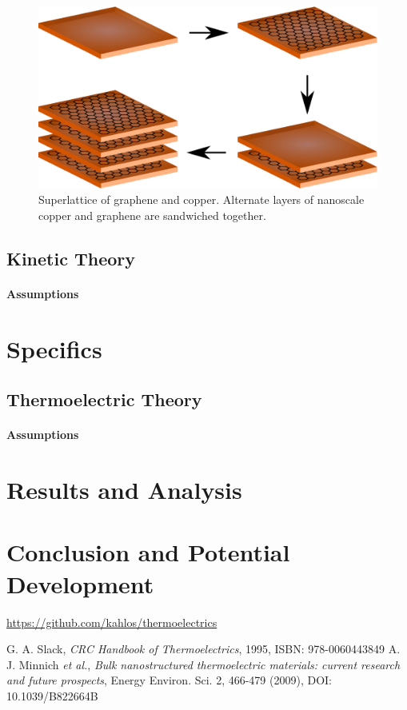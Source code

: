 \documentclass[12pt,titlepage,draft]{article}
\begin{document}
\begin{figure}
	\centering
	\includegraphics{graphene-superlattice.eps}
	\caption{Superlattice of graphene and copper. Alternate layers of
	nanoscale copper and graphene are sandwiched together.}
\end{figure}

\subsection{Kinetic Theory}
\paragraph{Assumptions}

\section{Specifics}
\subsection{Thermoelectric Theory}
\paragraph{Assumptions}

\section{Results and Analysis}

\section{Conclusion and Potential Development}

\url{https://github.com/kahlos/thermoelectrics}


\begin{thebibliography}{2}
G. A. Slack, \emph{CRC Handbook of Thermoelectrics}, 1995, ISBN: 978-0060443849
A. J. Minnich \emph{et al.}, \emph{Bulk nanostructured thermoelectric materials: current research and future prospects}, Energy Environ. Sci. 2, 466-479 (2009), DOI: 10.1039/B822664B
\end{thebibliography}
\end{document}
